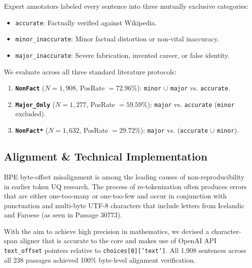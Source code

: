 \documentclass[conference]{IEEEtran}
\begin{document}
Expert annotators labeled every sentence into three mutually exclusive categories:
\begin{itemize}
    \item \texttt{accurate}: Factually verified against Wikipedia.
    \item \texttt{minor\_inaccurate}: Minor factual distortion or non-vital inaccuracy.
    \item \texttt{major\_inaccurate}: Severe fabrication, invented career, or false identity.
\end{itemize}

We evaluate across all three standard literature protocols:
\begin{enumerate}
    \item \textbf{\texttt{NonFact}} ($N=1,908$, PosRate $= 72.96\%$): \texttt{minor} $\cup$ \texttt{major} vs. \texttt{accurate}.
    \item \textbf{\texttt{Major\_Only}} ($N=1,277$, PosRate $= 59.59\%$): \texttt{major} vs. \texttt{accurate} (\texttt{minor} excluded).
    \item \textbf{\texttt{NonFact*}} ($N=1,632$, PosRate $= 29.72\%$): \texttt{major} vs. (\texttt{accurate} $\cup$ \texttt{minor}).
\end{enumerate}

\subsection{Alignment \& Technical Implementation}
BPE byte-offset misalignment is among the leading causes of non-reproducibility in earlier token UQ research. The process of re-tokenization often produces errors that are either one-too-many or one-too-few and occur in conjunction with punctuation and multi-byte UTF-8 characters that include letters from Icelandic and Faroese (as seen in Passage 30773). 

With the aim to achieve high precision in mathematics, we devised a character-span aligner that is accurate to the core and makes use of OpenAI API \texttt{text\_offset} pointers relative to \texttt{choices[0]['text']}. All 1,908 sentences across all 238 passages achieved 100\% byte-level alignment verification.
\end{document}
